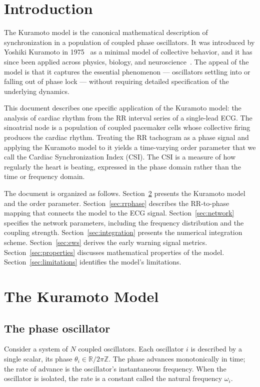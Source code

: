 \documentclass[11pt]{article}
\begin{document}
\section{Introduction}

The Kuramoto model is the canonical mathematical description of
synchronization in a population of coupled phase oscillators. It was
introduced by Yoshiki Kuramoto in 1975~\cite{kuramoto1975} as a minimal
model of collective behavior, and it has since been applied across
physics, biology, and neuroscience~\cite{acebron2005,strogatz2000}. The
appeal of the model is that it captures the essential phenomenon ---
oscillators settling into or falling out of phase lock --- without
requiring detailed specification of the underlying dynamics.

This document describes one specific application of the Kuramoto model:
the analysis of cardiac rhythm from the RR interval series of a
single-lead ECG. The sinoatrial node is a population of coupled
pacemaker cells whose collective firing produces the cardiac rhythm.
Treating the RR tachogram as a phase signal and applying the Kuramoto
model to it yields a time-varying order parameter that we call the
Cardiac Synchronization Index (CSI). The CSI is a measure of how
regularly the heart is beating, expressed in the phase domain rather
than the time or frequency domain.

The document is organized as follows. Section~\ref{sec:model} presents
the Kuramoto model and the order parameter. Section~\ref{sec:rrphase}
describes the RR-to-phase mapping that connects the model to the ECG
signal. Section~\ref{sec:network} specifies the network parameters,
including the frequency distribution and the coupling strength.
Section~\ref{sec:integration} presents the numerical integration scheme.
Section~\ref{sec:ews} derives the early warning signal metrics.
Section~\ref{sec:properties} discusses mathematical properties of the
model. Section~\ref{sec:limitations} identifies the model's limitations.

\section{The Kuramoto Model}\label{sec:model}

\subsection{The phase oscillator}

Consider a system of $N$ coupled oscillators. Each oscillator $i$ is
described by a single scalar, its phase $\theta_i \in \mathbb{R}/2\pi\mathbb{Z}$.
The phase advances monotonically in time; the rate of advance is the
oscillator's instantaneous frequency. When the oscillator is isolated,
the rate is a constant called the natural frequency $\omega_i$.
\end{document}
